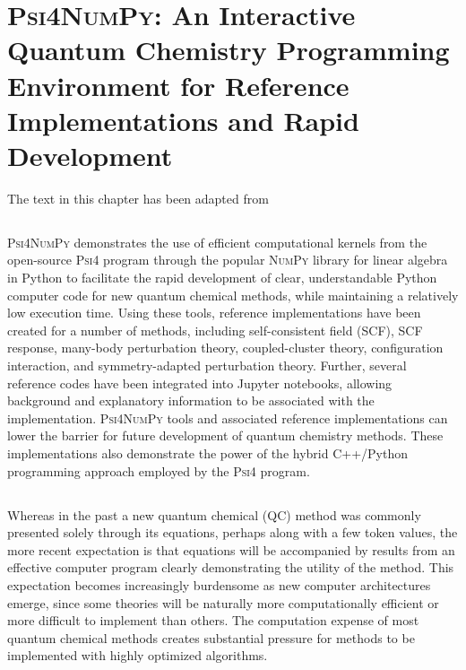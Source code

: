 \newcommand{\numpy}{\textsc{NumPy}\xspace}
\newcommand{\pfour}{\textsc{Psi4}\xspace}
\newcommand{\pfn}{\textsc{Psi4NumPy}\xspace}

\chapter[\pfn]{\pfn: An Interactive Quantum Chemistry Programming Environment for Reference Implementations and Rapid Development}
\label{ch:paper_05}

The text in this chapter has been adapted from

\section{}

\pfn demonstrates the use of efficient computational kernels from the open-source \pfour program through the popular \numpy library for linear algebra in Python to facilitate the rapid development of clear, understandable Python computer code for new quantum chemical methods, while maintaining a relatively low execution time.  Using these tools, reference implementations have been created for a number of methods, including self-consistent field (SCF), SCF response, many-body perturbation theory, coupled-cluster theory, configuration interaction, and symmetry-adapted perturbation theory.  Further, several reference codes have been integrated into Jupyter notebooks, allowing background and explanatory information to be associated with the implementation.  \pfn tools and associated reference implementations can lower the barrier for future development of quantum chemistry methods.  These implementations also demonstrate the power of the hybrid C++/Python programming approach employed by the \pfour program.

\section{\texorpdfstring{}{Introduction}}

Whereas in the past a new quantum chemical (QC) method was commonly presented solely through its equations, perhaps along with a few token values, the more recent expectation is that equations will be accompanied by results from an effective computer program clearly demonstrating the utility of the method.  This expectation becomes increasingly burdensome as new computer architectures emerge, since some theories will be naturally more computationally efficient or more difficult to implement than others.  The computation expense of most quantum chemical methods creates substantial pressure for methods to be implemented with highly optimized algorithms.

